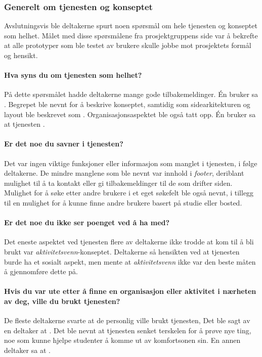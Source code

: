 \subsubsection{Generelt om tjenesten og konseptet}

Avslutningsvis ble deltakerne spurt noen spørsmål om hele tjenesten og konseptet som helhet. Målet med disse spørsmålene fra prosjektgruppens side var å bekrefte at alle prototyper som ble testet av brukere skulle jobbe mot prosjektets formål og hensikt.

\paragraph{Hva syns du om tjenesten som helhet?}
På dette spørsmålet hadde deltakerne mange gode tilbakemeldinger. Én bruker sa . Begrepet  ble nevnt for å beskrive konseptet, samtidig som sidearkitekturen og layout ble beskrevet som . Organisasjonsaspektet ble også tatt opp. Én bruker sa at tjenesten .

\paragraph{Er det noe du savner i tjenesten?}
Det var ingen viktige funksjoner eller informasjon som manglet i tjenesten, i følge deltakerne. De mindre manglene som ble nevnt var innhold i {\em  footer}, deriblant mulighet til å ta kontakt eller gi tilbakemeldinger til de som drifter siden. Mulighet for å søke etter andre brukere i et eget søkefelt ble også nevnt, i tillegg til en mulighet for å kunne finne andre brukere basert på studie eller bosted.

\paragraph{Er det noe du ikke ser poenget ved å ha med?}
Det eneste aspektet ved tjenesten flere av deltakerne ikke trodde at kom til å bli brukt var {\em  aktivitetsvenn}-konseptet. Deltakerne så hensikten ved at tjenesten burde ha et sosialt aspekt, men mente at {\em  aktivitetsvenn} ikke var den beste måten å gjennomføre dette på.

\paragraph{Hvis du var ute etter å finne en organisasjon eller aktivitet i nærheten av deg, ville du brukt tjenesten?}
De fleste deltakerne svarte at de personlig ville brukt tjenesten, Det ble sagt av en deltaker at . Det ble nevnt at tjenesten senket terskelen for å prøve nye ting, noe som kunne hjelpe studenter å komme ut av komfortsonen sin. En annen deltaker sa at .

